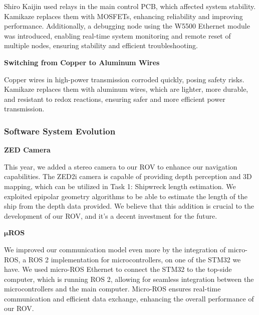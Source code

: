 Shiro Kaijin used relays in the main control PCB, which affected system stability. Kamikaze replaces them with MOSFETs, enhancing reliability and improving performance. Additionally, a debugging node using the W5500 Ethernet module was introduced, enabling real-time system monitoring and remote reset of multiple nodes, ensuring stability and efficient troubleshooting.

\vspace{0.2cm}
\textbf{Switching from Copper to Aluminum Wires}

Copper wires in high-power transmission corroded quickly, posing safety risks. Kamikaze replaces them with aluminum wires, which are lighter, more durable, and resistant to redox reactions, ensuring safer and more efficient power transmission.

\vspace{0.2cm}
\subsubsection{Software System Evolution}

\textbf{ZED Camera}

This year, we added a stereo camera to our ROV to enhance our navigation capabilities. The ZED2i camera is capable of providing depth perception and 3D mapping, which can be utilized in Task 1: Shipwreck length estimation. We exploited epipolar geometry algorithms to be able to estimate the length of the ship from the depth data provided. We believe that this addition is crucial to the development of our ROV, and it's a decent investment for the future.

\vspace{0.2cm}
\textbf{$\boldsymbol{\mu}$ROS}

We improved our communication model even more by the integration of micro-ROS, a ROS 2 implementation for microcontrollers, on one of the STM32 we have. We used micro-ROS Ethernet to connect the STM32 to the top-side computer, which is running ROS 2, allowing for seamless integration between the microcontrollers and the main computer. Micro-ROS ensures real-time communication and efficient data exchange, enhancing the overall performance of our ROV.